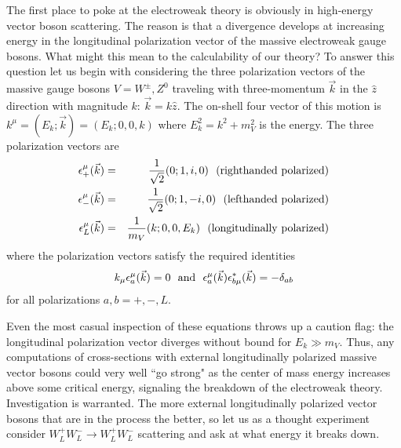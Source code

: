 \documentclass[12pt]{article}
\def\beq{\begin{eqnarray}}
\def\eeq{\end{eqnarray}}
\def\bea{\begin{eqnarray}}
\def\eea{\end{eqnarray}}
\begin{document}
The first place to poke at the electroweak theory is obviously in high-energy vector boson scattering.  The reason is that a divergence develops at increasing energy in the longitudinal polarization vector of the massive electroweak gauge bosons.  What might this mean to the calculability of our theory? To answer this question let us begin with considering the three polarization vectors of the massive gauge bosons $V=W^\pm,Z^0$ traveling with three-momentum $\vec k$  in the $\hat z$ direction with magnitude $k$: $\vec k=k\hat z$.  The on-shell four vector of this motion is $k^\mu=(E_k;\vec k)=(E_k;0,0,k)$ where $E_k^2=k^2+m_V^2$ is the energy. The three polarization vectors are
\bea
\epsilon^\mu_+(\vec k)&=& \frac{1}{\sqrt{2}}(0;1,i,0)~~{\rm (righthanded~polarized)}\\
\epsilon^\mu_-(\vec k)&=& \frac{1}{\sqrt{2}}(0;1,-i,0)~~{\rm (lefthanded~polarized)}\\
\epsilon^\mu_L(\vec k)&=&\frac{1}{m_V}(k;0,0,E_k)~~{\rm (longitudinally~polarized)}\label{eq:Lpol}
\eea
where the polarization vectors satisfy the required identities
\beq
k_\mu\epsilon^\mu_a(\vec k)=0~~{\rm and}~~\epsilon^\mu_a(\vec k)\epsilon^*_{b\mu}(\vec k)=-\delta_{ab}
\eeq
for all polarizations $a,b=+,-,L$.

Even the most casual inspection of these equations throws up a caution flag: the longitudinal polarization vector diverges without bound for $E_k\gg m_V$. Thus, any computations of cross-sections with external longitudinally polarized massive vector bosons could very well ``go strong" as the center of mass energy increases above some critical energy, signaling the breakdown of the electroweak theory.  Investigation is warranted.  The more external longitudinally polarized vector bosons that are in the process the better, so let us as a thought experiment consider $W_L^+W^-_L\to W_L^+W^-_L$ scattering and ask at what energy it breaks down.
\end{document}
